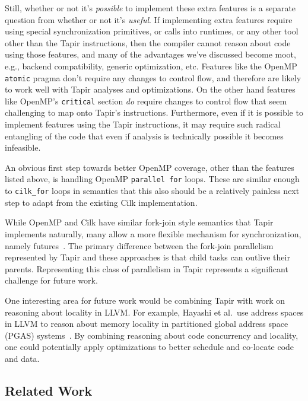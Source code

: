 \documentclass[sigconf]{acmart}
\begin{document}
Still, whether or not it's \emph{possible} to implement these extra features
is a separate question from whether or not it's \emph{useful}. If implementing
extra features require using special synchronization primitives, or calls into
runtimes, or any other tool other than the Tapir instructions, then the
compiler cannot reason about code using those features, and many of the
advantages we've discussed become moot, e.g., backend compatibility, generic
optimization, etc. Features like the OpenMP \texttt{atomic} pragma don't
require any changes to control flow, and therefore are likely to work well
with Tapir analyses and optimizations. On the other hand features like OpenMP's
\texttt{critical} section \emph{do} require changes to control flow that seem
challenging to map onto Tapir's instructions. Furthermore, even if it
is possible to implement features using the Tapir instructions, it may require
such radical entangling of the code that even if analysis is technically
possible it becomes infeasible.

An obvious first step towards better OpenMP coverage, other than the features
listed above, is handling OpenMP \texttt{parallel for} loops. These are similar enough
to \texttt{cilk\_for} loops in semantics that this also should be a relatively
painless next step to adapt from the existing Cilk implementation.

While OpenMP and Cilk have similar fork-join style semantics that Tapir
implements naturally, many allow a more flexible mechanism for synchronization, namely
futures~\cite{qthreads, chapel, hpx}. The primary difference between the
fork-join parallelism represented by Tapir and these approaches is that
child tasks can outlive their parents. Representing this class
of parallelism in Tapir represents a significant challenge for future work.

One interesting area for future work would be combining Tapir with work on
reasoning about locality in LLVM. For example, Hayashi et al.\
use address spaces in LLVM to reason about memory
locality in partitioned global address space (PGAS) systems~\cite{hayashi2015llvm}. By combining
reasoning about code concurrency and locality, one could potentially apply
optimizations to better schedule and co-locate code and data.

\subsection{Related Work} \label{Sec:Related}
\end{document}
